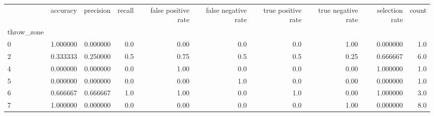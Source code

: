 \begin{tabular}{lrrrrrrrrr}
\toprule
{} &  accuracy &  precision &  recall &  false positive rate &  false negative rate &  true positive rate &  true negative rate &  selection rate &  count \\
throw\_zone &           &            &         &                      &                      &                     &                     &                 &        \\
\midrule
0          &  1.000000 &   0.000000 &     0.0 &                 0.00 &                  0.0 &                 0.0 &                1.00 &        0.000000 &    1.0 \\
2          &  0.333333 &   0.250000 &     0.5 &                 0.75 &                  0.5 &                 0.5 &                0.25 &        0.666667 &    6.0 \\
4          &  0.000000 &   0.000000 &     0.0 &                 1.00 &                  0.0 &                 0.0 &                0.00 &        1.000000 &    1.0 \\
5          &  0.000000 &   0.000000 &     0.0 &                 0.00 &                  1.0 &                 0.0 &                0.00 &        0.000000 &    1.0 \\
6          &  0.666667 &   0.666667 &     1.0 &                 1.00 &                  0.0 &                 1.0 &                0.00 &        1.000000 &    3.0 \\
7          &  1.000000 &   0.000000 &     0.0 &                 0.00 &                  0.0 &                 0.0 &                1.00 &        0.000000 &    8.0 \\
\bottomrule
\end{tabular}
